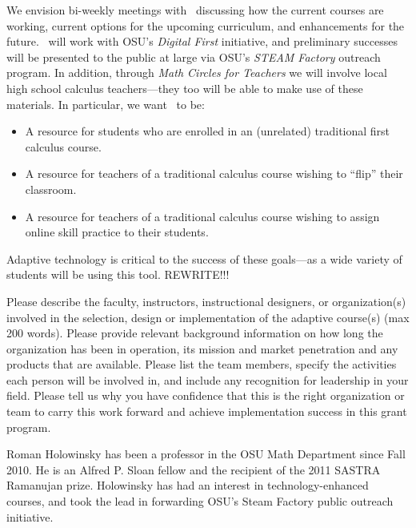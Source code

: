 

We envision bi-weekly meetings with \gratisu\ discussing how the
current courses are working, current options for the upcoming
curriculum, and enhancements for the future. \gratisu\ will work with
OSU's \textsl{Digital First} initiative, and preliminary successes
will be presented to the public at large via OSU's \textsl{STEAM
  Factory} outreach program. In addition, through \textsl{Math Circles
  for Teachers} we will involve local high school calculus
teachers---they too will be able to make use of these materials.  In
particular, we want \mooculus\ to be:
\begin{itemize}
\item A resource for students who are enrolled in an (unrelated)
  traditional first calculus course.
\item A resource for teachers of a traditional calculus course wishing
  to ``flip'' their classroom.
\item A resource for teachers of a traditional calculus course wishing to assign
online skill practice to their students.
\end{itemize}
Adaptive technology is critical to the success of these goals---as a
wide variety of students will be using this tool. REWRITE!!!







\begin{question}
Please describe the faculty, instructors, instructional
designers, or organization(s) involved in the selection, design or
implementation of the adaptive course(s) (max 200 words). Please
provide relevant background information on how long the organization
has been in operation, its mission and market penetration and any
products that are available. Please list the team members, specify
the activities each person will be involved in, and include any
recognition for leadership in your field. Please tell us why you
have confidence that this is the right organization or team to carry
this work forward and achieve implementation success in this grant
program.
\end{question}

Roman Holowinsky has been a professor in the OSU Math Department since
Fall 2010. He is an Alfred P. Sloan fellow and the recipient of the
2011 SASTRA Ramanujan prize. Holowinsky has had an interest in
technology-enhanced courses, and took the lead in forwarding OSU's
Steam Factory public outreach initiative.

